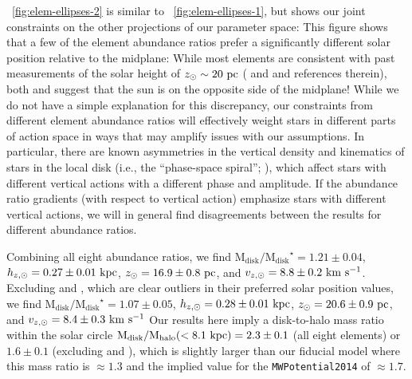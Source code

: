 \documentclass[modern]{aastex63}
\newcommand{\mdisk}{\ensuremath{\mathrm{M}_\mathrm{disk}}}
\newcommand{\mratio}{\ensuremath{\mdisk / \mdisk^\star}}
\newcommand{\hz}{\ensuremath{h_{z, \odot}}}
\newcommand{\zsun}{\ensuremath{z_\odot}}
\newcommand{\vzsun}{\ensuremath{v_{z, \odot}}}
\begin{document}
\figurename~\ref{fig:elem-ellipses-2} is similar to
\figurename~\ref{fig:elem-ellipses-1}, but shows our joint constraints on the
other projections of our parameter space:
This figure shows that a few of the element abundance ratios prefer a
significantly different solar position relative to the midplane:
While most elements are consistent with past measurements of the solar height of
$z_\odot \sim 20~\mathrm{pc}$ (\citealt{Bennett:2019} and \citealt{Bland-Hawthorn:2016}
and references therein), both  and  suggest
that the sun is on the opposite side of the midplane!
While we do not have a simple explanation for this discrepancy, our constraints
from different element abundance ratios will effectively weight stars in
different parts of action space in ways that may amplify issues with our
assumptions.
In particular, there are known asymmetries in the vertical density and
kinematics of stars in the local disk (i.e., the ``phase-space spiral'';
\citealt{Antoja:2018}), which affect stars with different vertical actions with
a different phase and amplitude.
If the abundance ratio gradients (with respect to vertical action) emphasize
stars with different vertical actions, we will in general find disagreements
between the results for different abundance ratios.

Combining all eight abundance ratios, we find $\mratio = 1.21 \pm 0.04$, $\hz =
0.27 \pm 0.01~\kpc$, $\zsun = 16.9 \pm 0.8~\pc$, and $\vzsun = 8.8 \pm
0.2~\kms$.
Excluding  and , which are clear outliers in
their preferred solar position values, we find $\mratio = 1.07\pm 0.05$, $\hz =
0.28 \pm 0.01~\kpc$, $\zsun = 20.6 \pm 0.9~\pc$, and $\vzsun = 8.4 \pm 0.3~\kms$
Our results here imply a disk-to-halo mass ratio within the solar circle ${\rm
M}_{\rm disk} / {\rm M}_{\rm halo} (<8.1~\mathrm{kpc}) = 2.3 \pm 0.1$ (all eight
elements) or $1.6\pm0.1$ (excluding  and ),
which is slightly larger than our fiducial model where this mass ratio is
$\approx 1.3$ \citep{gala} and the implied value for the
\texttt{MWPotential2014} \citep{Bovy:2015} of $\approx 1.7$.
\end{document}
